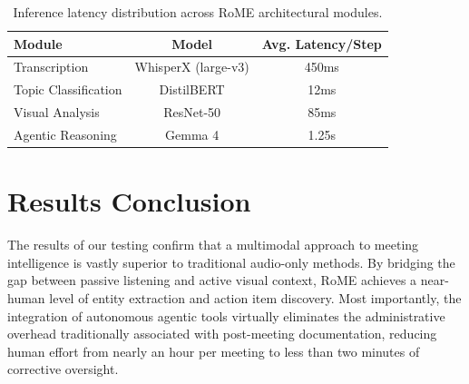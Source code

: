 \begin{table}[H]
\centering
\begin{tabular}{|l|c|c|}
\hline
\textbf{Module} & \textbf{Model} & \textbf{Avg. Latency/Step} \\ \hline
Transcription & WhisperX (large-v3) & 450ms \\ \hline
Topic Classification & DistilBERT & 12ms \\ \hline
Visual Analysis & ResNet-50 & 85ms \\ \hline
Agentic Reasoning & Gemma 4 & 1.25s \\ \hline
\end{tabular}
\caption{Inference latency distribution across RoME architectural modules.}
\label{tab:latency}
\end{table}

\section{Results Conclusion}
The results of our testing confirm that a multimodal approach to meeting intelligence is vastly superior to traditional audio-only methods. By bridging the gap between passive listening and active visual context, RoME achieves a near-human level of entity extraction and action item discovery. Most importantly, the integration of autonomous agentic tools virtually eliminates the administrative overhead traditionally associated with post-meeting documentation, reducing human effort from nearly an hour per meeting to less than two minutes of corrective oversight.
